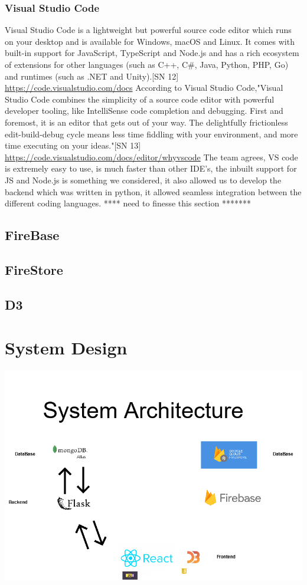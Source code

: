 \subsection{Visual Studio Code}
Visual Studio Code is a lightweight but powerful source code editor which runs on your desktop and is available for Windows, macOS and Linux. It comes with built-in support for JavaScript, TypeScript and Node.js and has a rich ecosystem of extensions for other languages (such as C++, C\#, Java, Python, PHP, Go) and runtimes (such as .NET and Unity).[SN 12] \url{https://code.visualstudio.com/docs}
According to Visual Studio Code,"Visual Studio Code combines the simplicity of a source code editor with powerful developer tooling, like IntelliSense code completion and debugging.
First and foremost, it is an editor that gets out of your way. The delightfully frictionless edit-build-debug cycle means less time fiddling with your environment, and more time executing on your ideas."[SN 13] \url{https://code.visualstudio.com/docs/editor/whyvscode}
The team agrees, VS code is extremely easy to use, is much faster than other IDE's, the inbuilt support for JS and Node.js is something we considered, it also allowed us to develop the backend which was written in python, it allowed seamless integration between the different coding languages. **** need to finesse this section *******


\section{FireBase}

\section{FireStore}

\section{D3}

\chapter{System Design}
\begin{center}    
      \includegraphics[scale=0.5]{img/basic architecture.png}
\end{center}

